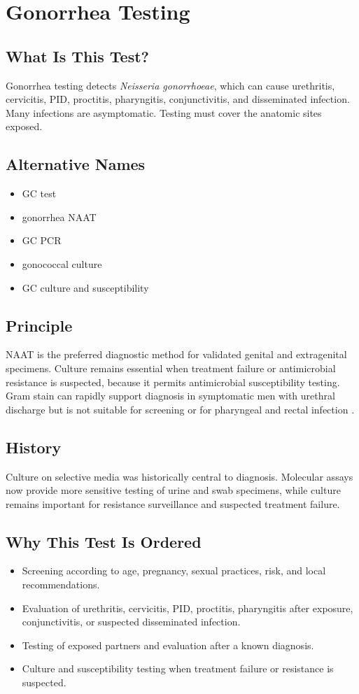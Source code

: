 \chapter{Gonorrhea Testing}

\section*{What Is This Test?}
Gonorrhea testing detects \textit{Neisseria gonorrhoeae}, which can cause urethritis, cervicitis, PID, proctitis, pharyngitis, conjunctivitis, and disseminated infection. Many infections are asymptomatic. Testing must cover the anatomic sites exposed.

\section*{Alternative Names}
\begin{itemize}
  \item GC test
  \item gonorrhea NAAT
  \item GC PCR
  \item gonococcal culture
  \item GC culture and susceptibility
\end{itemize}
\section*{Principle}
NAAT is the preferred diagnostic method for validated genital and extragenital specimens. Culture remains essential when treatment failure or antimicrobial resistance is suspected, because it permits antimicrobial susceptibility testing. Gram stain can rapidly support diagnosis in symptomatic men with urethral discharge but is not suitable for screening or for pharyngeal and rectal infection \cite{workowski2021sexually}.

\section*{History}
Culture on selective media was historically central to diagnosis. Molecular assays now provide more sensitive testing of urine and swab specimens, while culture remains important for resistance surveillance and suspected treatment failure.

\section*{Why This Test Is Ordered}
\begin{itemize}
  \item Screening according to age, pregnancy, sexual practices, risk, and local recommendations.
  \item Evaluation of urethritis, cervicitis, PID, proctitis, pharyngitis after exposure, conjunctivitis, or suspected disseminated infection.
  \item Testing of exposed partners and evaluation after a known diagnosis.
  \item Culture and susceptibility testing when treatment failure or resistance is suspected.
\end{itemize}

